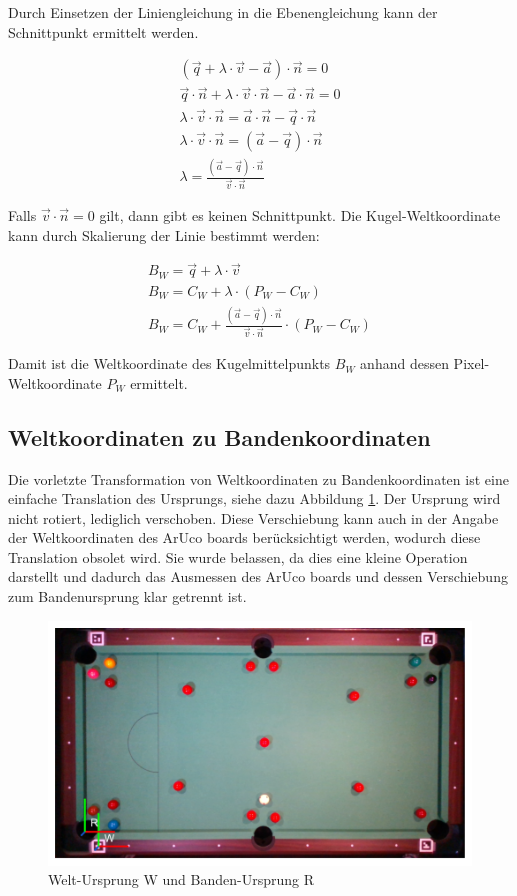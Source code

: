 Durch Einsetzen der Liniengleichung in die Ebenengleichung kann der Schnittpunkt ermittelt werden.

\begin{align}
(\vec{q} + \lambda \cdot \vec{v} - \vec{a}) \cdot \vec{n} = 0\\
\vec{q} \cdot \vec{n} + \lambda \cdot \vec{v} \cdot \vec{n} - \vec{a} \cdot \vec{n} = 0\\
\lambda \cdot \vec{v} \cdot \vec{n} = \vec{a} \cdot \vec{n} - \vec{q} \cdot \vec{n}\\
\lambda \cdot \vec{v} \cdot \vec{n} = (\vec{a} - \vec{q}) \cdot \vec{n}\\
\lambda = \frac{(\vec{a} - \vec{q}) \cdot \vec{n}}{\vec{v} \cdot \vec{n}}
\end{align}

Falls $\vec{v} \cdot \vec{n} = 0$ gilt, dann gibt es keinen Schnittpunkt.
Die Kugel-Weltkoordinate kann durch Skalierung der Linie bestimmt werden:

\begin{align}
B_W = \vec{q} + \lambda \cdot \vec{v}\\
B_W = C_W + \lambda \cdot (P_W - C_W)\\
B_W = C_W + \frac{(\vec{a} - \vec{q}) \cdot \vec{n}}{\vec{v} \cdot \vec{n}} \cdot (P_W - C_W)
\end{align}

Damit ist die Weltkoordinate des Kugelmittelpunkts $B_W$ anhand dessen Pixel-Weltkoordinate $P_W$ ermittelt.


\subsection{Weltkoordinaten zu Bandenkoordinaten}\label{kap:world_to_rail}

Die vorletzte Transformation von Weltkoordinaten zu Bandenkoordinaten ist eine einfache Translation des Ursprungs,
siehe dazu Abbildung \ref{fig:table_world_to_rail}. Der Ursprung wird nicht rotiert, lediglich verschoben.
Diese Verschiebung kann auch in der Angabe der Weltkoordinaten des ArUco boards berücksichtigt werden, wodurch diese
Translation obsolet wird. Sie wurde belassen, da dies eine kleine Operation darstellt und dadurch das Ausmessen des
ArUco boards und dessen Verschiebung zum Bandenursprung klar getrennt ist.

\begin{figure}[h!]
    \begin{center}
    \includegraphics[width=0.6\linewidth]{../common/resources/coordinate_systems/table_world_to_rail.png}
    \end{center}
    \caption{Welt-Ursprung W und Banden-Ursprung R}
    \label{fig:table_world_to_rail}
\end{figure}

